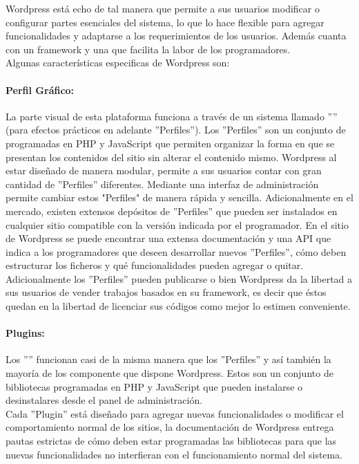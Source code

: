 Wordpress está echo de tal manera que permite a sus usuarios modificar o configurar partes esenciales del sistema, lo que lo hace flexible para agregar funcionalidades y adaptarse a los requerimientos de los usuarios. Además cuanta con un framework y una  que facilita la labor de los programadores.\\

Algunas características especificas de Wordpress son:

\paragraph{Perfil Gráfico:}	
La parte visual de esta plataforma funciona a través de un sistema llamado '''' (para efectos prácticos en adelante ''Perfiles''). Los ''Perfiles'' son un conjunto de  programadas en PHP y JavaScript que permiten organizar la forma en que se presentan los contenidos del sitio sin alterar el contenido mismo. Wordpress al estar diseñado de manera modular, permite a sus usuarios contar con gran cantidad de ''Perfiles'' diferentes. Mediante una interfaz de administración permite cambiar estos "Perfiles" de manera rápida y sencilla. Adicionalmente en el mercado, existen extensos depósitos de ''Perfiles'' que pueden ser instalados en cualquier sitio compatible con la versión indicada por el programador.
En el sitio de Wordpress se puede encontrar una extensa documentación y una API que indica a los programadores que deseen desarrollar nuevos ''Perfiles'', cómo deben estructurar los ficheros y qué funcionalidades pueden agregar o quitar. Adicionalmente los ''Perfiles'' pueden publicarse o bien Wordpress da la libertad a sus usuarios de vender trabajos basados en su framework, es decir que éstos quedan en la libertad de licenciar sus códigos como mejor lo estimen conveniente.

\paragraph{Plugins:}
Los ''''  funcionan casi de la misma manera que los ''Perfiles'' y así también la mayoría de los componente que dispone Wordpress. Estos son un conjunto de bibliotecas programadas en PHP y JavaScript que pueden instalarse o desinstalares desde el panel de administración.\\
Cada ''Plugin'' está diseñado para agregar nuevas funcionalidades o modificar el comportamiento normal de los sitios, la documentación de Wordpress entrega pautas estrictas de cómo deben estar programadas las bibliotecas para que las nuevas funcionalidades no interfieran con el funcionamiento normal del sistema.

